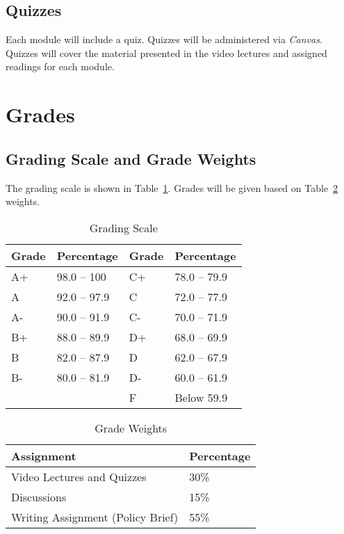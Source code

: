 \documentclass[11pt, letterpaper]{article}
\begin{document}
\subsection*{Quizzes}
Each module will include a quiz. Quizzes will be administered via \emph{Canvas}. Quizzes will cover the material presented in the video lectures and assigned readings for each module.

\section*{Grades}

\subsection*{Grading Scale and Grade Weights}  
The grading scale is shown in Table~\ref{tab:grading-scale}. Grades will be given based on Table~\ref{tab:grade-weights} weights.

\begin{table}[ht]
\centering
\caption{Grading Scale}
\begin{tabular}{llll}
\toprule
\textbf{Grade} & \textbf{Percentage} & \textbf{Grade} & \textbf{Percentage} \\ \hline
        A+ & 98.0 -- 100  & C+ & 78.0 -- 79.9 \\
        A  & 92.0 -- 97.9 & C  & 72.0 -- 77.9 \\
        A- & 90.0 -- 91.9 & C- & 70.0 -- 71.9 \\
        B+ & 88.0 -- 89.9 & D+ & 68.0 -- 69.9 \\
        B  & 82.0 -- 87.9 & D  & 62.0 -- 67.9 \\
        B- & 80.0 -- 81.9 & D- & 60.0 -- 61.9 \\
           &              & F  & Below 59.9   \\
\bottomrule
\end{tabular}
\label{tab:grading-scale}
\end{table}

\begin{table}[ht]
    \centering
    \caption{Grade Weights}
    \begin{tabular}{ll}
        \toprule
    \textbf{Assignment} & \textbf{Percentage} \\
    \midrule
    Video Lectures and Quizzes & 30\% \\
    Discussions & 15\% \\
    Writing Assignment (Policy Brief) & 55\% \\
    \bottomrule
    \end{tabular}
    \label{tab:grade-weights}
\end{table}
\end{document}
